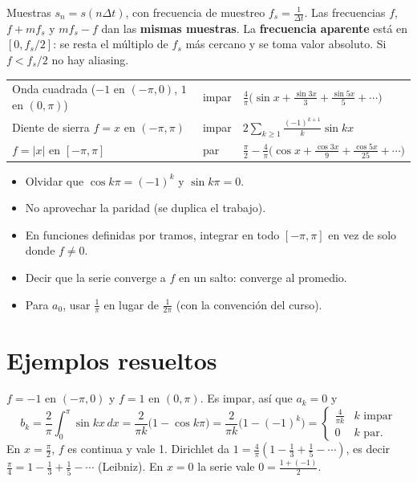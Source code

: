 \documentclass[11pt,a4paper]{article}
\begin{document}
\begin{resumen}
Muestras $s_n=s(n\Delta t)$, con frecuencia de muestreo $f_s=\frac1{\Delta t}$. Las frecuencias $f$, $f+mf_s$ y $mf_s-f$ dan las \textbf{mismas muestras}.
La \textbf{frecuencia aparente} está en $[0,f_s/2]$: se resta el múltiplo de $f_s$ más cercano y se toma valor absoluto. Si $f<f_s/2$ no hay aliasing.
\end{resumen}

\begin{resumen}
\begin{tabular}{@{}lll@{}}
Onda cuadrada ($-1$ en $(-\pi,0)$, $1$ en $(0,\pi)$) & impar & $\displaystyle\frac4\pi\Big(\sin x+\frac{\sin3x}3+\frac{\sin5x}5+\cdots\Big)$\\[8pt]
Diente de sierra $f=x$ en $(-\pi,\pi)$ & impar & $\displaystyle2\sum_{k\ge1}\frac{(-1)^{k+1}}{k}\sin kx$\\[8pt]
$f=|x|$ en $[-\pi,\pi]$ & par & $\displaystyle\frac\pi2-\frac4\pi\Big(\cos x+\frac{\cos3x}9+\frac{\cos5x}{25}+\cdots\Big)$
\end{tabular}
\end{resumen}

\begin{ojo}
\begin{itemize}[leftmargin=*,itemsep=1pt]
\item Olvidar que $\cos k\pi=(-1)^k$ y $\sin k\pi=0$.
\item No aprovechar la paridad (se duplica el trabajo).
\item En funciones definidas por tramos, integrar en todo $[-\pi,\pi]$ en vez de solo donde $f\neq0$.
\item Decir que la serie converge a $f$ en un salto: converge al promedio.
\item Para $a_0$, usar $\frac1\pi$ en lugar de $\frac1{2\pi}$ (con la convención del curso).
\end{itemize}
\end{ojo}

\section{Ejemplos resueltos}

\begin{ejemplo}
$f=-1$ en $(-\pi,0)$ y $f=1$ en $(0,\pi)$. Es impar, así que $a_k=0$ y
\[
b_k=\frac2\pi\int_0^\pi\sin kx\,dx=\frac2{\pi k}\big(1-\cos k\pi\big)=\frac2{\pi k}\big(1-(-1)^k\big)=\begin{cases}\frac4{\pi k}&k\text{ impar}\\0&k\text{ par.}\end{cases}
\]
En $x=\frac\pi2$, $f$ es continua y vale 1. Dirichlet da $1=\frac4\pi(1-\frac13+\frac15-\cdots)$, es decir $\frac\pi4=1-\frac13+\frac15-\cdots$ (Leibniz). En $x=0$ la serie vale $0=\frac{1+(-1)}2$.
\end{ejemplo}
\end{document}
